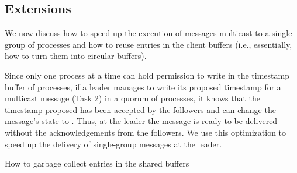 






\subsection{Extensions}
\label{sec:extensions}

We now discuss how to speed up the execution of messages multicast to a single group of processes and how to reuse entries in the client buffers (i.e., essentially, how to turn them into circular buffers).

Since only one process at a time can hold permission to write in the timestamp buffer of processes, if a leader manages to write its proposed timestamp for a multicast message (Task 2) in a quorum of processes, it knows that the timestamp proposed has been accepted by the followers and can change the message's state to \ordered.
Thus, at the leader the message is ready to be delivered without the acknowledgements from the followers.
We use this optimization to speed up the delivery of single-group messages at the leader.

How to garbage collect entries in the shared buffers












